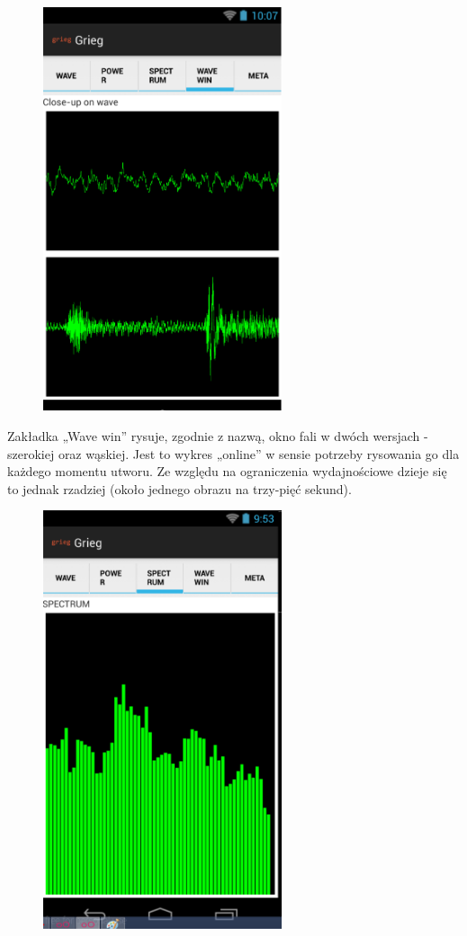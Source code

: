 \begin{figure}[H]
  \centering
  \includegraphics[width=7cm]{images/full_wave_window}
\end{figure}

Zakładka „Wave win” rysuje, zgodnie z nazwą, okno fali w dwóch wersjach - szerokiej oraz wąskiej.
Jest to wykres „online” w sensie potrzeby rysowania go dla każdego momentu utworu. Ze względu na
ograniczenia wydajnościowe dzieje się to jednak rzadziej (około jednego obrazu na trzy-pięć sekund).

\begin{figure}[H]
  \centering
  \includegraphics[width=7cm]{images/full_spectrum}
\end{figure}

